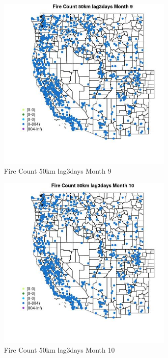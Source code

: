 \begin{figure} 
\centering  
\includegraphics[width=0.77\textwidth]{Code_Outputs/Report_ML_input_PM25_Step4_part_f_de_duplicated_aveswNAs_MapObsMo9Fire_Count_50km_lag3days.jpg} 
\caption{\label{fig:Report_ML_input_PM25_Step4_part_f_de_duplicated_aveswNAsMapObsMo9Fire_Count_50km_lag3days}Fire Count 50km lag3days Month 9} 
\end{figure} 
 

\begin{figure} 
\centering  
\includegraphics[width=0.77\textwidth]{Code_Outputs/Report_ML_input_PM25_Step4_part_f_de_duplicated_aveswNAs_MapObsMo10Fire_Count_50km_lag3days.jpg} 
\caption{\label{fig:Report_ML_input_PM25_Step4_part_f_de_duplicated_aveswNAsMapObsMo10Fire_Count_50km_lag3days}Fire Count 50km lag3days Month 10} 
\end{figure} 
 

